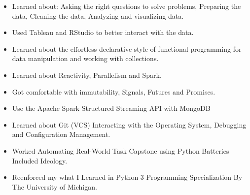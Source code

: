 \documentclass[10pt,a4paper,ragged2e,withhyper]{altacv}
\begin{document}
\begin{paracol}{2}


   \begin{itemize}
      \item Learned about: Asking the right questions to solve problems, Preparing the data, Cleaning the data, Analyzing and visualizing data.
      \item Used Tableau and RStudio to better interact with the data.
   \end{itemize}

   \divider
   
   
   \begin{itemize}
      \item Learned about the effortless declarative style of functional programming for data manipulation and working with collections.
      \item Learned about Reactivity, Parallelism and Spark.
      \item Got comfortable with immutability, Signals, Futures and Promises.
      \item Use the Apache Spark Structured Streaming API with MongoDB
   \end{itemize}
   
   \divider

   \begin{itemize}
      \item Learned about Git (VCS) Interacting with the Operating System, Debugging and Configuration Management. 
      \item Worked Automating Real-World Task Capstone using Python Batteries Included Ideology.
      \item Reenforced my what I Learned in Python 3 Programming Specialization By The University of Michigan.
   \end{itemize}
   \divider



\end{paracol}
\end{document}
